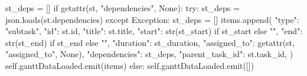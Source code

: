 \documentclass{report}
\begin{document}
\begin{python}
                    st_deps = []
                    if getattr(st, "dependencies", None):
                        try:
                            st_deps = json.loads(st.dependencies)
                        except Exception:
                            st_deps = []
                    items.append({
                        "type": "subtask",
                        "id": st.id,
                        "title": st.title,
                        "start": str(st_start) if st_start else "",
                        "end": str(st_end) if st_end else "",
                        "duration": st_duration,
                        "assigned_to": getattr(st, "assigned_to", None),
                        "dependencies": st_deps,
                        "parent_task_id": st.task_id,
                    })
            self.ganttDataLoaded.emit(items)
        else:
            self.ganttDataLoaded.emit([])


\end{python}
\end{document}
